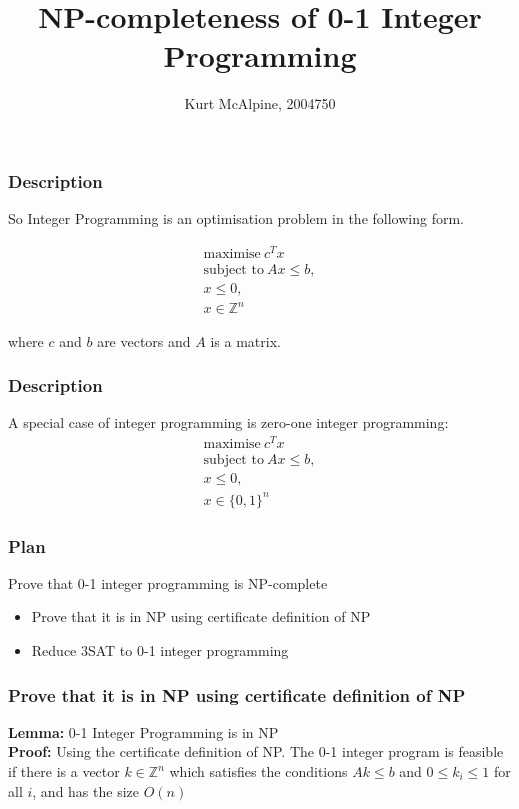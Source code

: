\documentclass[mathserif]{beamer}
\title{NP-completeness of 0-1 Integer Programming}
\author{Kurt McAlpine, 2004750}
\begin{document}
\frame{\titlepage}

\begin{frame}
\frametitle{Description}
So Integer Programming is an optimisation problem in the following form.

\begin{align*}
\text{maximise}\ c^Tx\\
\text{subject to}\ Ax \leq b,\\
x \leq 0,\\
x \in \mathbb{Z}^n
\end{align*}

where $c$ and $b$ are vectors and $A$ is a matrix.

\end{frame}

\begin{frame}
\frametitle{Description}
A special case of integer programming is zero-one integer programming:
\begin{align*}
\text{maximise}\ c^Tx\\
\text{subject to}\ Ax \leq b,\\
x \leq 0,\\
x \in \{0, 1\}^n
\end{align*}
\end{frame}

\begin{frame}
\frametitle{Plan}
Prove that 0-1 integer programming is NP-complete
\begin{itemize}
\item Prove that it is in NP using certificate definition of NP
\item Reduce 3SAT to 0-1 integer programming
\end{itemize}
\end{frame}

\begin{frame}
\frametitle{Prove that it is in NP using certificate definition of NP}
\textbf{Lemma:} 0-1 Integer Programming is in NP\\
\textbf{Proof:} Using the certificate definition of NP. The 0-1 integer program
is feasible if there is a vector $k \in \mathbb{Z}^n$ which satisfies the
conditions $Ak \leq b$ and $0 \leq k_i \leq 1$ for all $i$, and has the size
$O(n)$
\end{frame}
\end{document}
